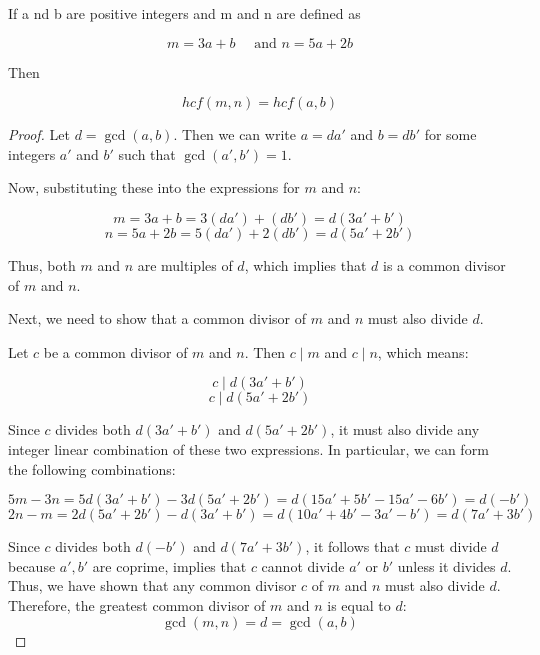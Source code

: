 \documentclass{tufte-handout}
\begin{document}
\begin{question}

If a nd b are positive integers and m and n are defined as

\[ m=3a+b \quad \text{ and } n=5a+2b \]

Then

\[ hcf(m,n) = hcf(a,b) \]

\begin{proof}
Let \( d = \gcd(a, b) \).  
Then we can write \( a = d a' \) and \( b = d b' \) for some integers \( a' \) 
and \( b' \) such that \( \gcd(a', b') = 1 \).

Now, substituting these into the expressions for \( m \) and \( n \):

\[ m = 3a + b = 3(da') + (db') = d(3a' + b') \]
\[ n = 5a + 2b = 5(da') + 2(db') = d(5a' + 2b') \]

Thus, both \( m \) and \( n \) are multiples of \( d \), which implies that \( d \) 
is a common divisor of \( m \) and \( n \).

Next, we need to show that a common divisor of \( m \) and \( n \) must also divide \( d \).

Let \( c \) be a common divisor of \( m \) and \( n \).  
Then \( c \mid m \) and \( c \mid n \), which means:

\[ c \mid d(3a' + b') \]
\[ c \mid d(5a' + 2b') \]   

Since \( c \) divides both \( d(3a' + b') \) and \( d(5a' + 2b') \), it must also divide any integer
linear combination of these two expressions. In particular, we can form the following combinations:

\[ 5m - 3n = 5d(3a' + b') - 3d(5a' + 2b') = d(15a' + 5b' - 15a' - 6b') = d(-b') \]
\[ 2n - m = 2d(5a' + 2b') - d(3a' + b') = d(10a' + 4b' - 3a' - b') = d(7a' + 3b') \]

Since \( c \) divides both \( d(-b') \) and \( d(7a' + 3b') \), it follows that \( c \) must divide \( d \)
because \( a', b' \) are coprime, implies that \( c \) cannot divide \( a' \) or \( b' \) unless it divides \( d \).
Thus, we have shown that any common divisor \( c \) of \( m \) and \( n \) must also divide \( d \).
Therefore, the greatest common divisor of \( m \) and \( n \) is equal to \( d \):
\[ \gcd(m, n) = d = \gcd(a, b) \]
\end{proof}

\end{question}
\end{document}
